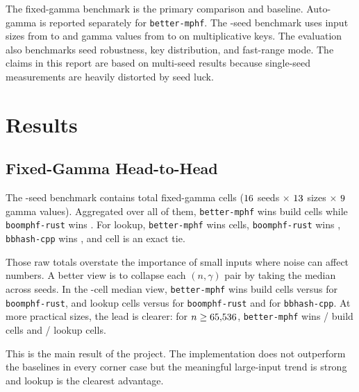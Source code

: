 \documentclass[10pt]{article}
\begin{document}
The fixed-gamma benchmark is the primary comparison and baseline. Auto-gamma is reported separately for \texttt{better-mphf}. The \PaperSeedCount{}-seed benchmark uses \PaperSizeCount{} input sizes from \PaperNMin{} to \PaperNMax{} and \PaperGammaCount{} gamma values from \PaperGammaMin{} to \PaperGammaMax{} on multiplicative keys. The evaluation also benchmarks seed robustness, key distribution, and fast-range mode. The claims in this report are based on multi-seed results because single-seed measurements are heavily distorted by seed luck.

\section{Results}
\subsection{Fixed-Gamma Head-to-Head}
The \PaperSeedCount{}-seed benchmark contains \PaperFixedCellCount{} total fixed-gamma cells ($16$ seeds $\times$ $13$ sizes $\times$ $9$ gamma values). Aggregated over all of them, \texttt{better-mphf} wins \PaperFixedBuildBetterWins{} build cells while \texttt{boomphf-rust} wins \PaperFixedBuildBoomWins{}. For lookup, \texttt{better-mphf} wins \PaperFixedLookupBetterWins{} cells, \texttt{boomphf-rust} wins \PaperFixedLookupBoomWins{}, \texttt{bbhash-cpp} wins \PaperFixedLookupCppWins{}, and \PaperFixedLookupTieCount{} cell is an exact tie.

Those raw totals overstate the importance of small inputs where noise can affect numbers. A better view is to collapse each $(n,\gamma)$ pair by taking the median across seeds. In the \PaperCollapsedCellCount{}-cell median view, \texttt{better-mphf} wins \PaperMedianBuildBetterWins{} build cells versus \PaperMedianBuildBoomWins{} for \texttt{boomphf-rust}, and \PaperMedianLookupBetterWins{} lookup cells versus \PaperMedianLookupBoomWins{} for \texttt{boomphf-rust} and \PaperMedianLookupCppWins{} for \texttt{bbhash-cpp}. At more practical sizes, the lead is clearer: for $n \ge 65{,}536$, \texttt{better-mphf} wins \PaperLargeBuildBetterWins{} / \PaperLargeCellCount{} build cells and \PaperLargeLookupBetterWins{} / \PaperLargeCellCount{} lookup cells.

This is the main result of the project. The implementation does not outperform the baselines in every corner case but the meaningful large-input trend is strong and lookup is the clearest advantage.
\end{document}
